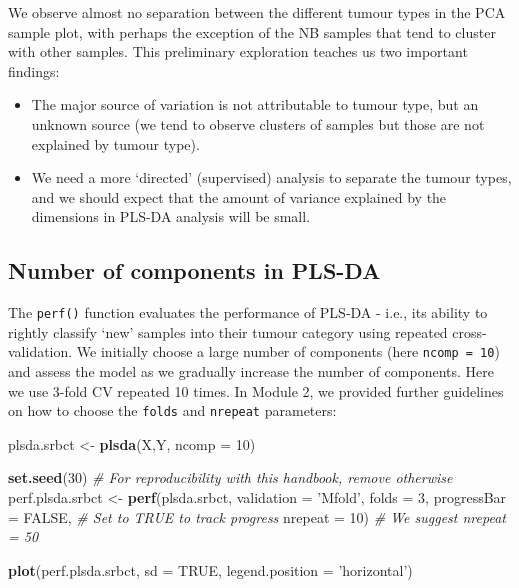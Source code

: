 \documentclass[]{book}
\newenvironment{Shaded}{\begin{snugshade}}{\end{snugshade}}
\newcommand{\CommentTok}[1]{\textcolor[rgb]{0.56,0.35,0.01}{\textit{#1}}}
\newcommand{\DataTypeTok}[1]{\textcolor[rgb]{0.13,0.29,0.53}{#1}}
\newcommand{\DecValTok}[1]{\textcolor[rgb]{0.00,0.00,0.81}{#1}}
\newcommand{\KeywordTok}[1]{\textcolor[rgb]{0.13,0.29,0.53}{\textbf{#1}}}
\newcommand{\NormalTok}[1]{#1}
\newcommand{\OtherTok}[1]{\textcolor[rgb]{0.56,0.35,0.01}{#1}}
\newcommand{\StringTok}[1]{\textcolor[rgb]{0.31,0.60,0.02}{#1}}
\providecommand{\tightlist}{%
  \setlength{\itemsep}{0pt}\setlength{\parskip}{0pt}}
\begin{document}
We observe almost no separation between the different tumour types in the PCA sample plot, with perhaps the exception of the NB samples that tend to cluster with other samples. This preliminary exploration teaches us two important findings:

\begin{itemize}
\tightlist
\item
  The major source of variation is not attributable to tumour type, but an unknown source (we tend to observe clusters of samples but those are not explained by tumour type).
\item
  We need a more `directed' (supervised) analysis to separate the tumour types, and we should expect that the amount of variance explained by the dimensions in PLS-DA analysis will be small.
\end{itemize}

\hypertarget{number-of-components-in-pls-da}{%
\subsection{Number of components in PLS-DA}\label{number-of-components-in-pls-da}}

The \texttt{perf()} function evaluates the performance of PLS-DA - i.e., its ability to rightly classify `new' samples into their tumour category using repeated cross-validation. We initially choose a large number of components (here \texttt{ncomp\ =\ 10}) and assess the model as we gradually increase the number of components. Here we use 3-fold CV repeated 10 times. In Module 2, we provided further guidelines on how to choose the \texttt{folds} and \texttt{nrepeat} parameters:

\begin{Shaded}
\begin{Highlighting}[]
\NormalTok{plsda.srbct <-}\StringTok{ }\KeywordTok{plsda}\NormalTok{(X,Y, }\DataTypeTok{ncomp =} \DecValTok{10}\NormalTok{)}

\KeywordTok{set.seed}\NormalTok{(}\DecValTok{30}\NormalTok{) }\CommentTok{# For reproducibility with this handbook, remove otherwise}
\NormalTok{perf.plsda.srbct <-}\StringTok{ }\KeywordTok{perf}\NormalTok{(plsda.srbct, }\DataTypeTok{validation =} \StringTok{'Mfold'}\NormalTok{, }\DataTypeTok{folds =} \DecValTok{3}\NormalTok{, }
                  \DataTypeTok{progressBar =} \OtherTok{FALSE}\NormalTok{,  }\CommentTok{# Set to TRUE to track progress}
                  \DataTypeTok{nrepeat =} \DecValTok{10}\NormalTok{)         }\CommentTok{# We suggest nrepeat = 50}

\KeywordTok{plot}\NormalTok{(perf.plsda.srbct, }\DataTypeTok{sd =} \OtherTok{TRUE}\NormalTok{, }\DataTypeTok{legend.position =} \StringTok{'horizontal'}\NormalTok{)}
\end{Highlighting}
\end{Shaded}
\end{document}
